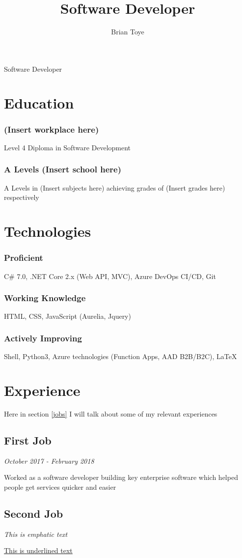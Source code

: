 \documentclass{article}
\author{Brian Toye}
\title{Software Developer}
\renewcommand{\maketitle}{
\begin{center}
{\huge\bfseries
\theauthor}

\vspace{.25em}

Software Developer
\end{center}
}
\begin{document}
\maketitle

\section{Education}

\subsubsection{(Insert workplace here)}
Level 4 Diploma in Software Development

\subsubsection{A Levels (Insert school here)}
A Levels in (Insert subjects here) achieving grades of (Insert grades here) respectively

\section{Technologies}

\subsubsection{Proficient}
C\# 7.0, .NET Core 2.x (Web API, MVC), Azure DevOps CI/CD, Git

\subsubsection{Working Knowledge}
HTML, CSS, JavaScript (Aurelia, Jquery)

\subsubsection{Actively Improving}
Shell, Python3, Azure technologies (Function Apps, AAD B2B/B2C), {\LaTeX}

\section{Experience\label{jobs}}

Here in section \ref{jobs} I will talk about some of my relevant experiences

\subsection{First Job}

\textit {October 2017 - February 2018}

Worked as a software developer building key enterprise software which helped people get services quicker and easier

\subsection{Second Job}

\emph{This is emphatic text}

\underline{This is underlined text}
\end{document}
